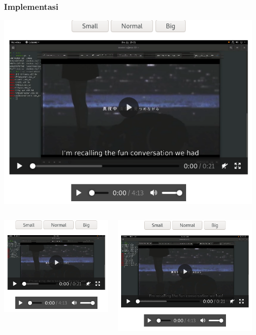 \documentclass{beamer}
\begin{document}
\begin{frame}
    \frametitle{Implementasi}
    \begin{center}
        \includegraphics[scale = .2]{5.png} 
    \end{center}
    \begin{columns}
        \begin{center}
        \includegraphics[scale = .2]{3.png}
        \end{center}
        \begin{center}
        \includegraphics[scale = .2]{4.png}
        \end{center}
    \end{columns}
\end{frame}
\end{document}
